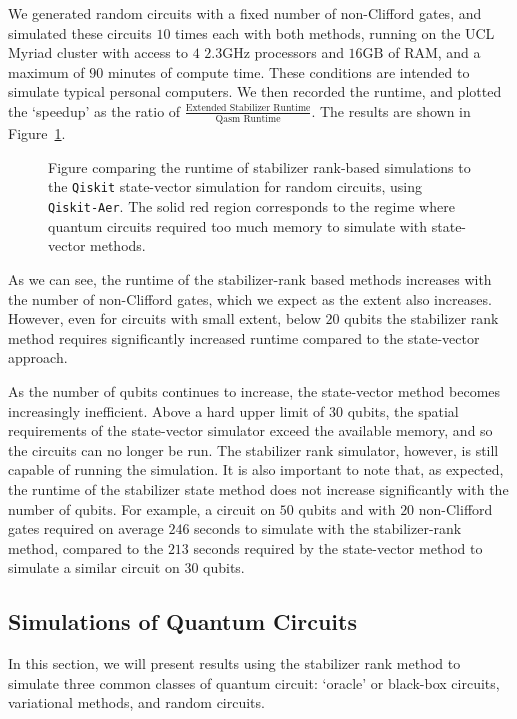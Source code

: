 We generated random circuits with a fixed number of non-Clifford gates, and simulated these circuits $10$ times each with both methods, running on the UCL Myriad cluster with access to $4$ $2.3\mathrm{GHz}$ processors and $16\mathrm{GB}$ of RAM, and a maximum of $90$ minutes of compute time. These conditions are intended to simulate typical personal computers. We then recorded the runtime, and plotted the `speedup' as the ratio of $\frac{\text{Extended Stabilizer Runtime}}{\text{Qasm Runtime}}$. The results are shown in Figure~\ref{fig:qiskit_race}.
\begin{figure}[t]
\centering
\begin{scaletikzpicturetowidth}{0.75\textwidth}
    
\end{scaletikzpicturetowidth}
\caption{Figure comparing the runtime of stabilizer rank-based simulations to the \texttt{Qiskit} state-vector simulation for random circuits, using \texttt{Qiskit-Aer}. The solid red region corresponds to the regime where quantum circuits required too much memory to simulate with state-vector methods.}\label{fig:qiskit_race}
\end{figure}
As we can see, the runtime of the stabilizer-rank based methods increases with the number of non-Clifford gates, which we expect as the extent also increases. However, even for circuits with small extent, below $20$ qubits the stabilizer rank method requires significantly increased runtime compared to the state-vector approach.\par
As the number of qubits continues to increase, the state-vector method becomes increasingly inefficient. Above a hard upper limit of $30$ qubits, the spatial requirements of the state-vector simulator exceed the available memory, and so the circuits can no longer be run. The stabilizer rank simulator, however, is still capable of running the simulation. It is also important to note that, as expected, the runtime of the stabilizer state method does not increase significantly with the number of qubits. For example, a circuit on $50$ qubits and with $20$ non-Clifford gates required on average $246$ seconds to simulate with the stabilizer-rank method, compared to the $213$ seconds required by the state-vector method to simulate a similar circuit on $30$ qubits.
\subsection{Simulations of Quantum Circuits}\label{sec:circuit_simulations}
In this section, we will present results using the stabilizer rank method to simulate three common classes of quantum circuit: `oracle' or black-box circuits, variational methods, and random circuits.
